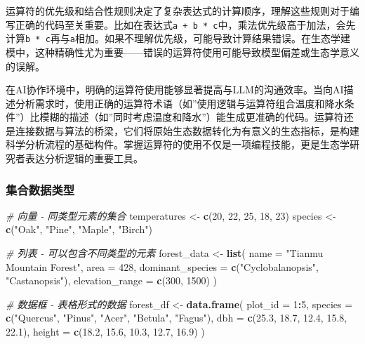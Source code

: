 \documentclass[
]{book}
\newenvironment{Shaded}{\begin{snugshade}}{\end{snugshade}}
\newcommand{\AttributeTok}[1]{\textcolor[rgb]{0.13,0.29,0.53}{#1}}
\newcommand{\CommentTok}[1]{\textcolor[rgb]{0.56,0.35,0.01}{\textit{#1}}}
\newcommand{\DecValTok}[1]{\textcolor[rgb]{0.00,0.00,0.81}{#1}}
\newcommand{\FloatTok}[1]{\textcolor[rgb]{0.00,0.00,0.81}{#1}}
\newcommand{\FunctionTok}[1]{\textcolor[rgb]{0.13,0.29,0.53}{\textbf{#1}}}
\newcommand{\NormalTok}[1]{#1}
\newcommand{\OtherTok}[1]{\textcolor[rgb]{0.56,0.35,0.01}{#1}}
\newcommand{\SpecialCharTok}[1]{\textcolor[rgb]{0.81,0.36,0.00}{\textbf{#1}}}
\newcommand{\StringTok}[1]{\textcolor[rgb]{0.31,0.60,0.02}{#1}}
\begin{document}
运算符的优先级和结合性规则决定了复杂表达式的计算顺序，理解这些规则对于编写正确的代码至关重要。比如在表达式\texttt{a\ +\ b\ *\ c}中，乘法优先级高于加法，会先计算\texttt{b\ *\ c}再与\texttt{a}相加。如果不理解优先级，可能导致计算结果错误。在生态学建模中，这种精确性尤为重要------错误的运算符使用可能导致模型偏差或生态学意义的误解。

在AI协作环境中，明确的运算符使用能够显著提高与LLM的沟通效率。当向AI描述分析需求时，使用正确的运算符术语（如''使用逻辑与运算符组合温度和降水条件''）比模糊的描述（如''同时考虑温度和降水''）能生成更准确的代码。运算符还是连接数据与算法的桥梁，它们将原始生态数据转化为有意义的生态指标，是构建科学分析流程的基础构件。掌握运算符的使用不仅是一项编程技能，更是生态学研究者表达分析逻辑的重要工具。

\hypertarget{ux96c6ux5408ux6570ux636eux7c7bux578b}{%
\subsubsection{集合数据类型}\label{ux96c6ux5408ux6570ux636eux7c7bux578b}}

\begin{Shaded}
\begin{Highlighting}[]
\CommentTok{\# 向量 {-} 同类型元素的集合}
\NormalTok{temperatures }\OtherTok{\textless{}{-}} \FunctionTok{c}\NormalTok{(}\DecValTok{20}\NormalTok{, }\DecValTok{22}\NormalTok{, }\DecValTok{25}\NormalTok{, }\DecValTok{18}\NormalTok{, }\DecValTok{23}\NormalTok{)}
\NormalTok{species }\OtherTok{\textless{}{-}} \FunctionTok{c}\NormalTok{(}\StringTok{"Oak"}\NormalTok{, }\StringTok{"Pine"}\NormalTok{, }\StringTok{"Maple"}\NormalTok{, }\StringTok{"Birch"}\NormalTok{)}

\CommentTok{\# 列表 {-} 可以包含不同类型的元素}
\NormalTok{forest\_data }\OtherTok{\textless{}{-}} \FunctionTok{list}\NormalTok{(}
  \AttributeTok{name =} \StringTok{"Tianmu Mountain Forest"}\NormalTok{,}
  \AttributeTok{area =} \DecValTok{428}\NormalTok{,}
  \AttributeTok{dominant\_species =} \FunctionTok{c}\NormalTok{(}\StringTok{"Cyclobalanopsis"}\NormalTok{, }\StringTok{"Castanopsis"}\NormalTok{),}
  \AttributeTok{elevation\_range =} \FunctionTok{c}\NormalTok{(}\DecValTok{300}\NormalTok{, }\DecValTok{1500}\NormalTok{)}
\NormalTok{)}

\CommentTok{\# 数据框 {-} 表格形式的数据}
\NormalTok{forest\_df }\OtherTok{\textless{}{-}} \FunctionTok{data.frame}\NormalTok{(}
  \AttributeTok{plot\_id =} \DecValTok{1}\SpecialCharTok{:}\DecValTok{5}\NormalTok{,}
  \AttributeTok{species =} \FunctionTok{c}\NormalTok{(}\StringTok{"Quercus"}\NormalTok{, }\StringTok{"Pinus"}\NormalTok{, }\StringTok{"Acer"}\NormalTok{, }\StringTok{"Betula"}\NormalTok{, }\StringTok{"Fagus"}\NormalTok{),}
  \AttributeTok{dbh =} \FunctionTok{c}\NormalTok{(}\FloatTok{25.3}\NormalTok{, }\FloatTok{18.7}\NormalTok{, }\FloatTok{12.4}\NormalTok{, }\FloatTok{15.8}\NormalTok{, }\FloatTok{22.1}\NormalTok{),}
  \AttributeTok{height =} \FunctionTok{c}\NormalTok{(}\FloatTok{18.2}\NormalTok{, }\FloatTok{15.6}\NormalTok{, }\FloatTok{10.3}\NormalTok{, }\FloatTok{12.7}\NormalTok{, }\FloatTok{16.9}\NormalTok{)}
\NormalTok{)}
\end{Highlighting}
\end{Shaded}
\end{document}
